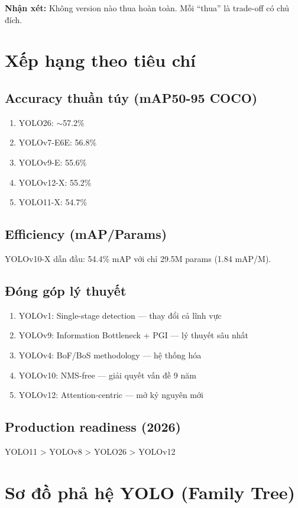 \textbf{Nhận xét:} Không version nào thua hoàn toàn. Mỗi ``thua'' là trade-off có chủ đích.

\section{Xếp hạng theo tiêu chí}

\subsection{Accuracy thuần túy (mAP50-95 COCO)}
\begin{enumerate}
    \item YOLO26: $\sim$57.2\%
    \item YOLOv7-E6E: 56.8\%
    \item YOLOv9-E: 55.6\%
    \item YOLOv12-X: 55.2\%
    \item YOLO11-X: 54.7\%
\end{enumerate}

\subsection{Efficiency (mAP/Params)}
YOLOv10-X dẫn đầu: 54.4\% mAP với chỉ 29.5M params (1.84 mAP/M).

\subsection{Đóng góp lý thuyết}
\begin{enumerate}
    \item YOLOv1: Single-stage detection — thay đổi cả lĩnh vực
    \item YOLOv9: Information Bottleneck + PGI — lý thuyết sâu nhất
    \item YOLOv4: BoF/BoS methodology — hệ thống hóa
    \item YOLOv10: NMS-free — giải quyết vấn đề 9 năm
    \item YOLOv12: Attention-centric — mở kỷ nguyên mới
\end{enumerate}

\subsection{Production readiness (2026)}
YOLO11 > YOLOv8 > YOLO26 > YOLOv12

\section{Sơ đồ phả hệ YOLO (Family Tree)}

